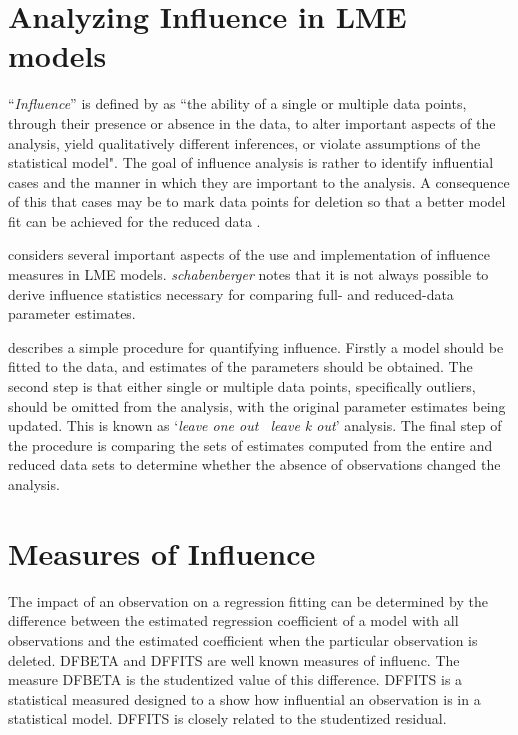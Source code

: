 \documentclass[00-MASTER.tex]{subfiles}
\begin{document}
	
\section{Analyzing Influence in LME models}
 ``\textit{Influence}” is defined by \citet{schab} as ``the ability of a single or multiple data points, through their presence
	or absence in the data, to alter important aspects of the analysis, yield qualitatively different inferences, or
	violate assumptions of the statistical model". The goal of influence analysis is rather to identify influential cases and the manner in
	which they are important to the analysis. A consequence of this that cases may be to mark data
	points for deletion so that a better model fit can be achieved for the reduced data \citep{schab}.  
	
	
	
	\citet{schab} considers several important aspects of the use and implementation of influence measures in LME models. \textit{schabenberger} notes that it is not always possible to
	derive influence statistics necessary for comparing full- and reduced-data parameter estimates. 

	\citet{schab} describes a simple procedure for quantifying influence. Firstly a model should be fitted to the data, and
	estimates of the parameters should be obtained. The second step is that either single or multiple data points, specifically outliers,
	should be omitted from the analysis, with the original parameter estimates being updated. This is known as `\textit{leave one out \ leave k out}' analysis. The final step of the procedure is comparing the 	sets of estimates computed from the entire and reduced data sets to determine whether the absence of observations changed the
	analysis.
	
	
	\section{Measures of Influence} 
	The impact of an observation on a regression fitting can be determined by the difference between the estimated regression coefficient of a model with all observations and the estimated coefficient when the particular observation is deleted. DFBETA and DFFITS are well known measures of influenc. The measure DFBETA is the studentized value of this difference.	DFFITS is a statistical measured designed to a show how influential an observation is in a statistical model. DFFITS is closely related to the studentized residual.
\end{document}
